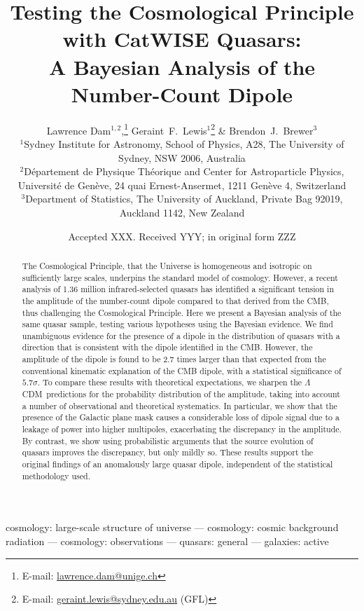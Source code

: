 \documentclass[fleqn,usenatbib]{mnras}
\title[Bayesian Analysis of the Number-Count Dipole]{Testing the Cosmological Principle with CatWISE Quasars: \\ A Bayesian Analysis of the Number-Count Dipole}
\author[Dam, Lewis \& Brewer]{
Lawrence Dam$^{1,2}$,\thanks{E-mail: \href{mailto:lawrence.dam@unige.ch}{lawrence.dam@unige.ch}} 
Geraint~F.~Lewis$^{1}$\thanks{E-mail: \href{mailto:geraint.lewis@sydney.edu.au}{geraint.lewis@sydney.edu.au} (GFL)}
\&
Brendon~J.~Brewer$^{3}$
\\
$^{1}$Sydney Institute for Astronomy, School of Physics, A28, The University of Sydney, NSW 2006, Australia\\
$^{2}$D\'{e}partement de Physique Th\'{e}orique and Center for Astroparticle Physics, Universit\'{e} de Gen\`{e}ve, 24 quai Ernest-Ansermet, 1211 Gen\`{e}ve 4, Switzerland\\
$^{3}$Department of Statistics, The University of Auckland, Private Bag 92019, Auckland 1142, New Zealand\\
}
\date{Accepted XXX. Received YYY; in original form ZZZ}
\def\LCDM{$\Lambda$CDM}
\begin{document}
\label{firstpage}
\pagerange{\pageref{firstpage}--\pageref{lastpage}}
\maketitle

\begin{abstract}
The Cosmological Principle, that the Universe is homogeneous and isotropic on sufficiently large scales, underpins the standard model of cosmology. 
%
However, a recent analysis of 1.36 million infrared-selected quasars has identified a significant tension in the amplitude of the 
number-count dipole compared to that derived from the CMB, 
%
thus challenging the Cosmological Principle.
%
Here we present a Bayesian analysis of the same quasar sample, testing various hypotheses using the Bayesian evidence. 
%
We find unambiguous evidence for the presence of a dipole in the distribution of quasars with a direction that is consistent with
the dipole identified in the CMB. However, the amplitude of the dipole is found to be 2.7 times
larger than that expected from the conventional kinematic explanation of the CMB dipole,
with a statistical significance of $5.7\sigma$.
%
To compare these results with theoretical expectations, we sharpen the \LCDM\ predictions for the probability distribution of the
amplitude, taking into account a number of observational and theoretical systematics. In particular, we show that the presence of the Galactic plane mask causes a considerable loss of dipole signal due to a leakage of power into higher multipoles, exacerbating the discrepancy in the amplitude. By contrast, we show using probabilistic
arguments that the source evolution of quasars improves the discrepancy, but only mildly so.
These results support the original findings of an anomalously large quasar dipole, independent of
the statistical methodology used.
%
\end{abstract}

\begin{keywords}
cosmology: large-scale structure of universe — cosmology: cosmic background radiation — cosmology: observations — quasars: general — galaxies: active
\end{keywords}


\end{document}
